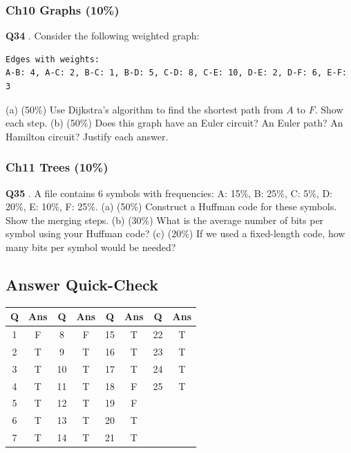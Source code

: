 \documentclass[10pt,a4paper,openany]{ctexbook}
\theoremstyle{definition}
\theoremstyle{remark}
\begin{document}
\subsubsection{Ch10 Graphs (10\%)}

\textbf{Q34} . Consider the following weighted graph:
{\footnotesize\begin{verbatim}
Edges with weights:
A-B: 4, A-C: 2, B-C: 1, B-D: 5, C-D: 8, C-E: 10, D-E: 2, D-F: 6, E-F: 3
\end{verbatim}}

(a) (50\%) Use Dijkstra's algorithm to find the shortest path from $A$ to $F$. Show each step.
(b) (50\%) Does this graph have an Euler circuit? An Euler path? An Hamilton circuit? Justify each answer.
\subsubsection{Ch11 Trees (10\%)}

\textbf{Q35} . A file contains 6 symbols with frequencies: A: 15\%, B: 25\%, C: 5\%, D: 20\%, E: 10\%, F: 25\%.
(a) (50\%) Construct a Huffman code for these symbols. Show the merging steps.
(b) (30\%) What is the average number of bits per symbol using your Huffman code?
(c) (20\%) If we used a fixed-length code, how many bits per symbol would be needed?
\vspace{-2pt}

\subsection{Answer Quick-Check}

\begin{center}
\begin{tabular}{cccccccc}
\hline
Q & Ans & Q & Ans & Q & Ans & Q & Ans \\ \hline
1 & F & 8 & F & 15 & T & 22 & T \\
2 & T & 9 & T & 16 & T & 23 & T \\
3 & T & 10 & T & 17 & T & 24 & T \\
4 & T & 11 & T & 18 & F & 25 & T \\
5 & T & 12 & T & 19 & F &  &  \\
6 & T & 13 & T & 20 & T &  &  \\
7 & T & 14 & T & 21 & T &  &  \\
\hline
\end{tabular}

\end{center}
\end{document}
